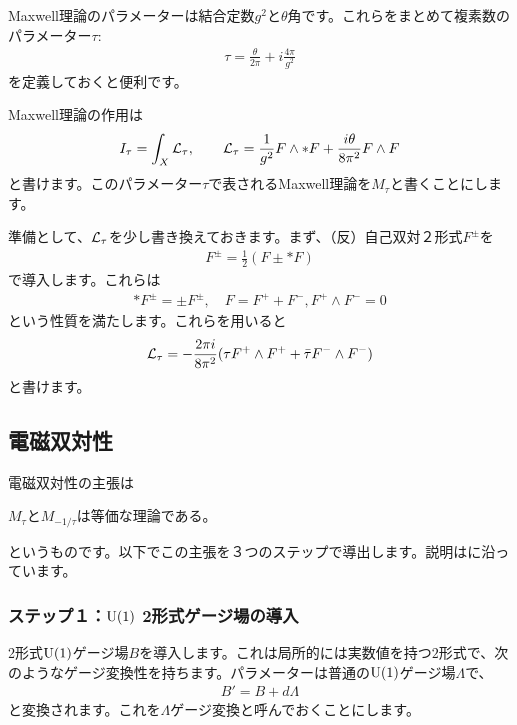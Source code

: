\documentclass[generalized_symmetry.tex]{subfiles}
\begin{document}
Maxwell理論のパラメーターは結合定数$g^2$と$\theta$角です。これらをまとめて複素数のパラメーター$\tau$:
\begin{align}
  \tau=\frac{\theta}{2\pi}+i\frac{4\pi}{g^2}
\end{align}
を定義しておくと便利です。

Maxwell理論の作用は
\begin{align}
  I_{\tau}=\int_{X} \mathcal{L}_{\tau},\qquad
  \mathcal{L}_{\tau}=\frac{1}{g^2}F\wedge *F+\frac{i\theta}{8\pi^2}F\wedge F
\end{align}
と書けます。このパラメーター$\tau$で表されるMaxwell理論を$M_{\tau}$と書くことにします。

準備として、$\mathcal{L}_{\tau}$を少し書き換えておきます。まず、（反）自己双対２形式$F^{\pm}$を
\begin{align}
  F^{\pm}=\frac{1}{2}(F\pm *F)
\end{align}
で導入します。これらは
\begin{align}
  *F^{\pm}=\pm F^{\pm},\quad F=F^{+}+F^{-}, F^{+}\wedge F^{-}=0
\end{align}
という性質を満たします。これらを用いると
\begin{align}
  \mathcal{L}_{\tau}=-\frac{2\pi i}{8\pi^2}(\tau F^{+}\wedge F^{+}+\bar{\tau} F^{-}\wedge F^{-})
\end{align}
と書けます。

\subsection{電磁双対性}
電磁双対性の主張は
\begin{emphasize}
  $M_{\tau}$と$M_{-1/\tau}$は等価な理論である。
\end{emphasize}
というものです。以下でこの主張を３つのステップで導出します。説明は\cite{Witten:1995gf}に沿っています。

\subsubsection{ステップ１：$\mbox{U}(1)$ 2形式ゲージ場の導入}

2形式$\mbox{U}(1)$ゲージ場$B$を導入します。これは局所的には実数値を持つ$2$形式で、次のようなゲージ変換性を持ちます。パラメーターは普通の$\mbox{U}(1)$ゲージ場$\Lambda$で、
\begin{align}
  B'= B + d\Lambda
\end{align}
と変換されます。これを$\Lambda$ゲージ変換と呼んでおくことにします。
\end{document}
